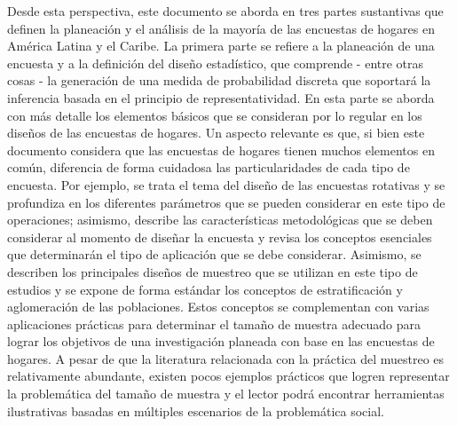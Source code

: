 \documentclass[
  12pt,
  spanish,
]{book}
\begin{document}
Desde esta perspectiva, este documento se aborda en tres partes sustantivas que definen la planeación y el análisis de la mayoría de las encuestas de hogares en América Latina y el Caribe. La primera parte se refiere a la planeación de una encuesta y a la definición del diseño estadístico, que comprende - entre otras cosas - la generación de una medida de probabilidad discreta que soportará la inferencia basada en el principio de representatividad. En esta parte se aborda con más detalle los elementos básicos que se consideran por lo regular en los diseños de las encuestas de hogares. Un aspecto relevante es que, si bien este documento considera que las encuestas de hogares tienen muchos elementos en común, diferencia de forma cuidadosa las particularidades de cada tipo de encuesta. Por ejemplo, se trata el tema del diseño de las encuestas rotativas y se profundiza en los diferentes parámetros que se pueden considerar en este tipo de operaciones; asimismo, describe las características metodológicas que se deben considerar al momento de diseñar la encuesta y revisa los conceptos esenciales que determinarán el tipo de aplicación que se debe considerar. Asimismo, se describen los principales diseños de muestreo que se utilizan en este tipo de estudios y se expone de forma estándar los conceptos de estratificación y aglomeración de las poblaciones. Estos conceptos se complementan con varias aplicaciones prácticas para determinar el tamaño de muestra adecuado para lograr los objetivos de una investigación planeada con base en las encuestas de hogares. A pesar de que la literatura relacionada con la práctica del muestreo es relativamente abundante, existen pocos ejemplos prácticos que logren representar la problemática del tamaño de muestra y el lector podrá encontrar herramientas ilustrativas basadas en múltiples escenarios de la problemática social.
\end{document}
